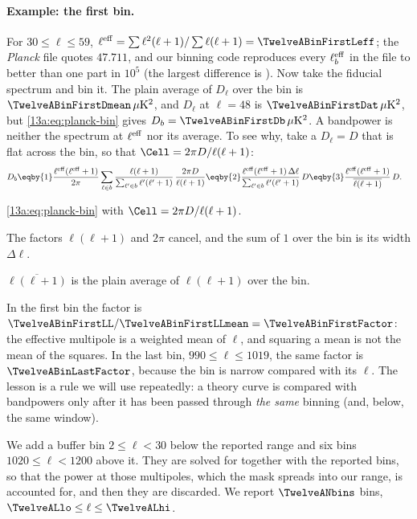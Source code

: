 \paragraph{Example: the first bin.} For $30\le\ell\le59$,
$\ell^{\rm eff}=\sum\ell^2(\ell+1)/\sum\ell(\ell+1)=\TwelveABinFirstLeff$; the \textit{Planck} file quotes $47.711$, and our
binning code reproduces every $\ell_b^{\rm eff}$ in the file to better than one part in $10^5$ (the largest difference is \TwelveALeffCheck). Now take the fiducial
spectrum and bin it. The plain average of $D_\ell$ over the bin is $\TwelveABinFirstDmean\,\mu{\rm K}^2$, and $D_\ell$ at
$\ell=48$ is $\TwelveABinFirstDat\,\mu{\rm K}^2$, but \eqref{13a:eq:planck-bin} gives $D_b=\TwelveABinFirstDb\,\mu{\rm K}^2$. A
bandpower is neither the spectrum at $\ell^{\rm eff}$ nor its average. To see why, take a $D_\ell=D$ that is flat
across the bin, so that $\Cell=2\pi D/\ell(\ell+1)$:
\begin{align}
  D_b
  &\eqby{1}\frac{\ell^{\rm eff}(\ell^{\rm eff}+1)}{2\pi}\sum_{\ell\in b}\frac{\ell(\ell+1)}{\sum_{\ell'\in b}\ell'(\ell'+1)}\,
     \frac{2\pi D}{\ell(\ell+1)}
   \eqby{2}\frac{\ell^{\rm eff}(\ell^{\rm eff}+1)\,\Delta\ell}{\sum_{\ell'\in b}\ell'(\ell'+1)}\,D
   \eqby{3}\frac{\ell^{\rm eff}(\ell^{\rm eff}+1)}{\overline{\ell(\ell+1)}}\,D .
\end{align}
\begin{explain}
  \item \eqref{13a:eq:planck-bin} with $\Cell=2\pi D/\ell(\ell+1)$.
  \item The factors $\ell(\ell+1)$ and $2\pi$ cancel, and the sum of $1$ over the bin is its width $\Delta\ell$.
  \item $\overline{\ell(\ell+1)}$ is the plain average of $\ell(\ell+1)$ over the bin.
\end{explain}
In the first bin the factor is $\TwelveABinFirstLL/\TwelveABinFirstLLmean=\TwelveABinFirstFactor$: the effective multipole is a weighted
mean of $\ell$, and squaring a mean is not the mean of the squares. In the last bin, $990\le\ell\le1019$, the
same factor is $\TwelveABinLastFactor$, because the bin is narrow compared with its $\ell$. The lesson is a rule we will use
repeatedly: a theory curve is compared with bandpowers only after it has been passed through \emph{the same}
binning (and, below, the same window).

We add a buffer bin $2\le\ell<30$ below the reported range and six bins $1020\le\ell<1200$ above it. They are
solved for together with the reported bins, so that the power at those multipoles, which the mask spreads into
our range, is accounted for, and then they are discarded. We report $\TwelveANbins$ bins, $\TwelveALlo\le\ell\le\TwelveALhi$.

